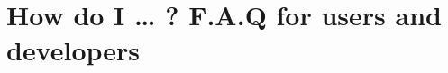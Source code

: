 \chapter[F.A.Q for users and developers]{How do I \ldots{} ? F.A.Q for users and developers}\label{text:04_faq}

\begin{comment}
	What will be included in this chapter :
		- User-facing stuff :
			- how to open/use the program, in general
				- use the help guide
				- say what can be loaded
				- describe interactions
				- describe viewing modes
				- describe output data (generation)
			- how to load data
				- what kind of filetypes are supported
				- what are some caveats/'gotchas' of the program
				- some of the options within the loading dialog
				- what the loading dialog should result in
			- how to generate grids
				- what the intent was to do something like this
				- how to use it
				- specify the process is blocking !!! no progressbar
				- what can be done with this
		- Dev-facing stuff :
				- How do I compile the program ?
					- The included third-party libraries
						- How to include them in the directory structure and in the compilation process
					- Compile the libs with the ./third_party/compile.{ps/sh} utilities
					- Use CMake
					- Learn about CMake flags !!!
				- How do I debug something ? -- Graphical
					- use renderdoc ! wonderful
				- How do I debug something ? -- Code
					- Learn a debugger (Qt's one is good)
					- Most code is documented, use this as a first step
					- Be warned, some things are multi-threaded so printf() might not always result in a useful thing.
				- How do I draw something ? [ NEEDED ??? ]
					- make sure context is bound
					- specify commands with an instance of QOpenGLFunctions (Scene, or within a drawable class)
					- some words about the composition of the widget, that all should be drawn and that Qt will do its stuff later
					- ping the reader back to the documentation of the pipeline
\end{comment}
